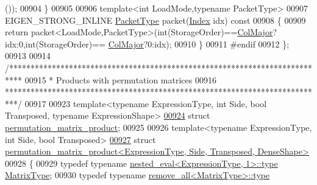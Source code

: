 \begin{DoxyCode}
      ());
00904   \}
00905   
00906   \textcolor{keyword}{template}<\textcolor{keywordtype}{int} LoadMode,\textcolor{keyword}{typename} PacketType>
00907   EIGEN\_STRONG\_INLINE \hyperlink{struct_eigen_1_1_packet_type}{PacketType} packet(\hyperlink{namespace_eigen_a62e77e0933482dafde8fe197d9a2cfde}{Index} idx)\textcolor{keyword}{ const}
00908 \textcolor{keyword}{  }\{
00909     \textcolor{keywordflow}{return} packet<LoadMode,PacketType>(int(StorageOrder)==\hyperlink{group__enums_ggaacded1a18ae58b0f554751f6cdf9eb13a0cbd4bdd0abcfc0224c5fcb5e4f6669a}{ColMajor}?idx:0,int(StorageOrder)==
      \hyperlink{group__enums_ggaacded1a18ae58b0f554751f6cdf9eb13a0cbd4bdd0abcfc0224c5fcb5e4f6669a}{ColMajor}?0:idx);
00910   \}
00911 \textcolor{preprocessor}{#endif}
00912 \};
00913 
00914 \textcolor{comment}{/***************************************************************************}
00915 \textcolor{comment}{* Products with permutation matrices}
00916 \textcolor{comment}{***************************************************************************/}
00917 
00923 \textcolor{keyword}{template}<\textcolor{keyword}{typename} ExpressionType, \textcolor{keywordtype}{int} S\textcolor{keywordtype}{id}e, \textcolor{keywordtype}{bool} Transposed, \textcolor{keyword}{typename} ExpressionShape>
\hyperlink{struct_eigen_1_1internal_1_1permutation__matrix__product}{00924} \textcolor{keyword}{struct }\hyperlink{struct_eigen_1_1internal_1_1permutation__matrix__product}{permutation\_matrix\_product};
00925 
00926 \textcolor{keyword}{template}<\textcolor{keyword}{typename} ExpressionType, \textcolor{keywordtype}{int} S\textcolor{keywordtype}{id}e, \textcolor{keywordtype}{bool} Transposed>
\hyperlink{struct_eigen_1_1internal_1_1permutation__matrix__product_3_01_expression_type_00_01_side_00_01_t00744509fe9d67128974220180aea840}{00927} \textcolor{keyword}{struct }\hyperlink{struct_eigen_1_1internal_1_1permutation__matrix__product_3_01_expression_type_00_01_side_00_01_t00744509fe9d67128974220180aea840}{permutation\_matrix\_product<ExpressionType, Side, Transposed, DenseShape>}
00928 \{
00929     \textcolor{keyword}{typedef} \textcolor{keyword}{typename} \hyperlink{class_eigen_1_1internal_1_1_tensor_lazy_evaluator_writable}{nested\_eval<ExpressionType, 1>::type} 
      \hyperlink{class_eigen_1_1internal_1_1_tensor_lazy_evaluator_writable}{MatrixType};
00930     \textcolor{keyword}{typedef} \textcolor{keyword}{typename} \hyperlink{group___sparse_core___module}{remove\_all<MatrixType>::type} 

\end{DoxyCode}
